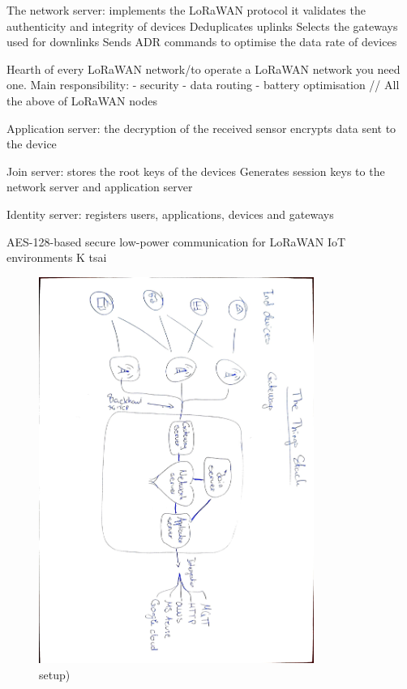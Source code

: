 The network server: 
implements the \ac{LoRaWAN} protocol
it validates the authenticity and integrity of devices
Deduplicates uplinks
Selects the gateways used for downlinks
Sends ADR commands to optimise the data rate of devices

Hearth of every \ac{LoRaWAN} network/to operate a \ac{LoRaWAN} network you need one.
Main responsibility:
- security
- data routing
- battery optimisation
// All the above of \ac{LoRaWAN} nodes

Application server:
the decryption of the received sensor
encrypts data sent to the device

Join server:
stores the root keys of the devices
Generates session keys to the network server and application server

Identity server:
registers users, applications, devices and gateways

AES-128-based secure low-power communication for \ac{LoRaWAN} IoT environments K tsai

\begin{figure}[H]
    \centering
    \includegraphics[width=0.8\textwidth]{figures/The Things Stack_page-0001.jpg}
    \caption{setup)}
    \label{fig:LoRaWAN_stack}
\end{figure}
















